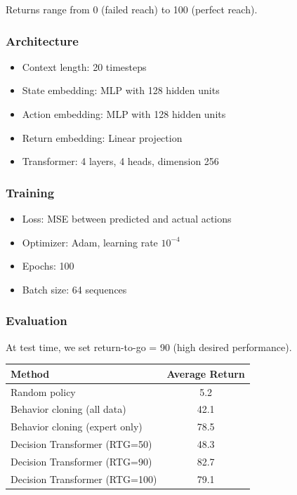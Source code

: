 Returns range from 0 (failed reach) to 100 (perfect reach).

\subsubsection{Architecture}

\begin{itemize}
    \item Context length: 20 timesteps
    \item State embedding: MLP with 128 hidden units
    \item Action embedding: MLP with 128 hidden units
    \item Return embedding: Linear projection
    \item Transformer: 4 layers, 4 heads, dimension 256
\end{itemize}

\subsubsection{Training}

\begin{itemize}
    \item Loss: MSE between predicted and actual actions
    \item Optimizer: Adam, learning rate $10^{-4}$
    \item Epochs: 100
    \item Batch size: 64 sequences
\end{itemize}

\subsubsection{Evaluation}

At test time, we set return-to-go = 90 (high desired performance).

\begin{center}
\begin{tabular}{lc}
\toprule
\textbf{Method} & \textbf{Average Return} \\
\midrule
Random policy & 5.2 \\
Behavior cloning (all data) & 42.1 \\
Behavior cloning (expert only) & 78.5 \\
Decision Transformer (RTG=50) & 48.3 \\
Decision Transformer (RTG=90) & 82.7 \\
Decision Transformer (RTG=100) & 79.1 \\
\bottomrule
\end{tabular}
\end{center}

